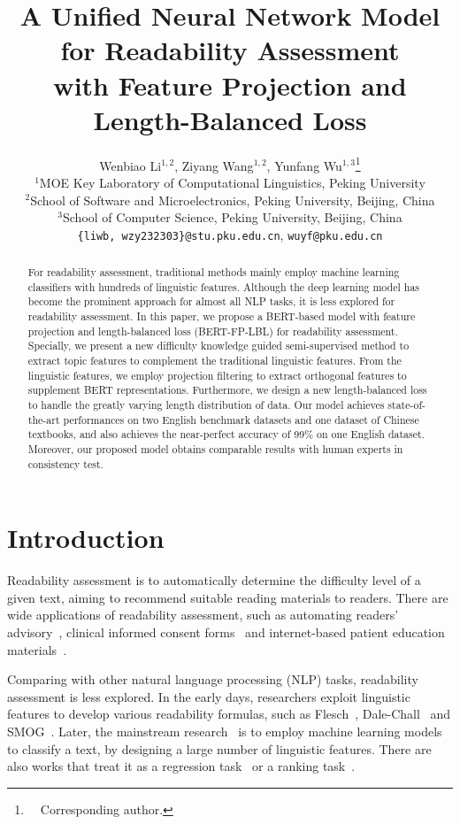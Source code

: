\documentclass[11pt]{article}
\title{A Unified Neural Network Model for Readability Assessment \\
with Feature Projection and Length-Balanced Loss}
\author{Wenbiao Li$^{1,2}$,
        Ziyang Wang$^{1,2}$, 
        Yunfang Wu$^{1,3}$\thanks{~~Corresponding author.} \\
    $^{1}$MOE Key Laboratory of Computational Linguistics, Peking University \\ 
    $^{2}$School of Software and Microelectronics, Peking University, Beijing, China \\
    $^{3}$School of Computer Science, Peking University, Beijing, China \\
    \texttt{\{liwb, wzy232303\}@stu.pku.edu.cn},
    \texttt{wuyf@pku.edu.cn}
    }
\begin{document}
\maketitle
\begin{abstract}
For readability assessment, traditional methods mainly employ machine learning classifiers with hundreds of linguistic features. Although the deep learning model has become the prominent approach for almost all NLP tasks, it is less explored for readability assessment.
In this paper, we propose a BERT-based model with feature projection and length-balanced loss (BERT-FP-LBL) for readability assessment. Specially, we present a new difficulty knowledge guided semi-supervised method to extract topic features to complement the traditional linguistic features. 
From the linguistic features, we employ projection filtering to extract orthogonal features to supplement BERT representations.
Furthermore, we design a new length-balanced loss to handle the greatly varying length distribution of data.
Our model achieves state-of-the-art performances on two English benchmark datasets and one dataset of Chinese textbooks, and also achieves the
near-perfect accuracy of 99\% on one English dataset. Moreover, our proposed model obtains comparable results with human experts in consistency test.


\end{abstract}

\section{Introduction}
Readability assessment is to automatically determine the difficulty level of a given text, aiming to recommend suitable reading materials to readers.
There are wide applications of readability assessment, such as automating readers’ advisory~\cite{pera2014automating}, clinical informed consent forms~\cite{perni2019assessment} and internet-based patient education materials~\cite{sare2020readability}.


Comparing with other natural language processing (NLP) tasks, readability assessment is less explored.
In the early days, researchers exploit linguistic features to develop various readability formulas, such as Flesch~\cite{flesch1948new}, Dale-Chall~\cite{dale1948formula} and SMOG~\cite{mc1969smog}. 
Later, the mainstream research~\cite{deutsch2020linguistic,hansen2021machine,lee2021pushing} is to employ machine learning models to classify a text, by designing a large number of linguistic features.
There are also works that treat it as a regression task~\cite{sheehan2010generating} or a ranking task~\cite{lee2022neural}.
\end{document}

